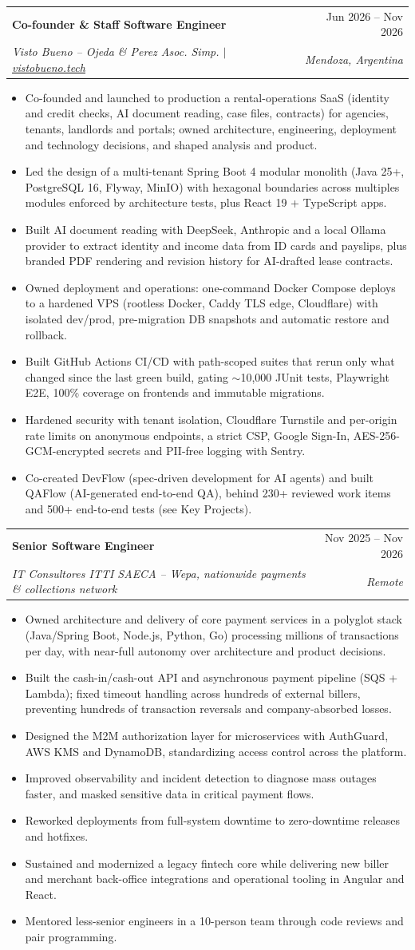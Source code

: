 \documentclass[letterpaper,11pt]{article}
\makeatletter
\newcommand{\resumeItem}[1]{
  \item\small{
    {#1 \vspace{-1pt}}
  }
}
\newcommand{\resumeSubheading}[4]{
  \needspace{4\baselineskip}\vspace{-1pt}\item
    \begin{tabular*}{0.97\textwidth}[t]{l@{\extracolsep{\fill}}r}
      \textbf{#1} & #2 \\
      \textit{\small#3} & \textit{\small #4} \\
    \end{tabular*}\vspace{-5pt}
}
\newcommand{\resumeItemListStart}{\begin{itemize}}
\newcommand{\resumeItemListEnd}{\end{itemize}\vspace{-3pt}}
\makeatother
\begin{document}
\resumeSubheading
  {Co-founder \& Staff Software Engineer}{Jun 2026 -- Nov 2026}
  {Visto Bueno -- Ojeda \& Perez Asoc. Simp. $|$ \href{https://vistobueno.tech}{\underline{vistobueno.tech}}}{Mendoza, Argentina}
  \resumeItemListStart
    \resumeItem{Co-founded and launched to production a rental-operations SaaS (identity and credit checks, AI document reading, case files, contracts) for agencies, tenants, landlords and portals; owned architecture, engineering, deployment and technology decisions, and shaped analysis and product.}
    \resumeItem{Led the design of a multi-tenant Spring Boot 4 modular monolith (Java 25+, PostgreSQL 16, Flyway, MinIO) with hexagonal boundaries across multiples modules enforced by architecture tests, plus React 19 + TypeScript apps.}
    \resumeItem{Built AI document reading with DeepSeek, Anthropic and a local Ollama provider to extract identity and income data from ID cards and payslips, plus branded PDF rendering and revision history for AI-drafted lease contracts.}
    \resumeItem{Owned deployment and operations: one-command Docker Compose deploys to a hardened VPS (rootless Docker, Caddy TLS edge, Cloudflare) with isolated dev/prod, pre-migration DB snapshots and automatic restore and rollback.}
    \resumeItem{Built GitHub Actions CI/CD with path-scoped suites that rerun only what changed since the last green build, gating $\sim$10,000 JUnit tests, Playwright E2E, 100\% coverage on frontends and immutable migrations.}
    \resumeItem{Hardened security with tenant isolation, Cloudflare Turnstile and per-origin rate limits on anonymous endpoints, a strict CSP, Google Sign-In, AES-256-GCM-encrypted secrets and PII-free logging with Sentry.}
    \resumeItem{Co-created DevFlow (spec-driven development for AI agents) and built QAFlow (AI-generated end-to-end QA), behind 230+ reviewed work items and 500+ end-to-end tests (see Key Projects).}
  \resumeItemListEnd

\resumeSubheading
  {Senior Software Engineer}{Nov 2025 -- Nov 2026}
  {IT Consultores ITTI SAECA -- Wepa, nationwide payments \& collections network}{Remote}
  \resumeItemListStart
    \resumeItem{Owned architecture and delivery of core payment services in a polyglot stack (Java/Spring Boot, Node.js, Python, Go) processing millions of transactions per day, with near-full autonomy over architecture and product decisions.}
    \resumeItem{Built the cash-in/cash-out API and asynchronous payment pipeline (SQS + Lambda); fixed timeout handling across hundreds of external billers, preventing hundreds of transaction reversals and company-absorbed losses.}
    \resumeItem{Designed the M2M authorization layer for microservices with AuthGuard, AWS KMS and DynamoDB, standardizing access control across the platform.}
    \resumeItem{Improved observability and incident detection to diagnose mass outages faster, and masked sensitive data in critical payment flows.}
    \resumeItem{Reworked deployments from full-system downtime to zero-downtime releases and hotfixes.}
    \resumeItem{Sustained and modernized a legacy fintech core while delivering new biller and merchant back-office integrations and operational tooling in Angular and React.}
    \resumeItem{Mentored less-senior engineers in a 10-person team through code reviews and pair programming.}
  \resumeItemListEnd
\end{document}
